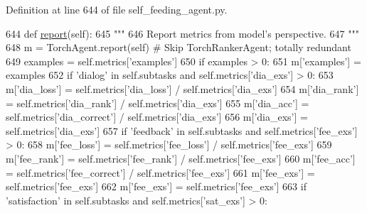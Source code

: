 Definition at line 644 of file self\+\_\+feeding\+\_\+agent.\+py.


\begin{DoxyCode}
644     \textcolor{keyword}{def }\hyperlink{namespaceprojects_1_1convai2_1_1eval__f1_a01a47b9c08dad189837a51f085defc45}{report}(self):
645         \textcolor{stringliteral}{"""}
646 \textcolor{stringliteral}{        Report metrics from model's perspective.}
647 \textcolor{stringliteral}{        """}
648         m = TorchAgent.report(self)  \textcolor{comment}{# Skip TorchRankerAgent; totally redundant}
649         examples = self.metrics[\textcolor{stringliteral}{'examples'}]
650         \textcolor{keywordflow}{if} examples > 0:
651             m[\textcolor{stringliteral}{'examples'}] = examples
652             \textcolor{keywordflow}{if} \textcolor{stringliteral}{'dialog'} \textcolor{keywordflow}{in} self.subtasks \textcolor{keywordflow}{and} self.metrics[\textcolor{stringliteral}{'dia\_exs'}] > 0:
653                 m[\textcolor{stringliteral}{'dia\_loss'}] = self.metrics[\textcolor{stringliteral}{'dia\_loss'}] / self.metrics[\textcolor{stringliteral}{'dia\_exs'}]
654                 m[\textcolor{stringliteral}{'dia\_rank'}] = self.metrics[\textcolor{stringliteral}{'dia\_rank'}] / self.metrics[\textcolor{stringliteral}{'dia\_exs'}]
655                 m[\textcolor{stringliteral}{'dia\_acc'}] = self.metrics[\textcolor{stringliteral}{'dia\_correct'}] / self.metrics[\textcolor{stringliteral}{'dia\_exs'}]
656                 m[\textcolor{stringliteral}{'dia\_exs'}] = self.metrics[\textcolor{stringliteral}{'dia\_exs'}]
657             \textcolor{keywordflow}{if} \textcolor{stringliteral}{'feedback'} \textcolor{keywordflow}{in} self.subtasks \textcolor{keywordflow}{and} self.metrics[\textcolor{stringliteral}{'fee\_exs'}] > 0:
658                 m[\textcolor{stringliteral}{'fee\_loss'}] = self.metrics[\textcolor{stringliteral}{'fee\_loss'}] / self.metrics[\textcolor{stringliteral}{'fee\_exs'}]
659                 m[\textcolor{stringliteral}{'fee\_rank'}] = self.metrics[\textcolor{stringliteral}{'fee\_rank'}] / self.metrics[\textcolor{stringliteral}{'fee\_exs'}]
660                 m[\textcolor{stringliteral}{'fee\_acc'}] = self.metrics[\textcolor{stringliteral}{'fee\_correct'}] / self.metrics[\textcolor{stringliteral}{'fee\_exs'}]
661                 m[\textcolor{stringliteral}{'fee\_exs'}] = self.metrics[\textcolor{stringliteral}{'fee\_exs'}]
662                 m[\textcolor{stringliteral}{'fee\_exs'}] = self.metrics[\textcolor{stringliteral}{'fee\_exs'}]
663             \textcolor{keywordflow}{if} \textcolor{stringliteral}{'satisfaction'} \textcolor{keywordflow}{in} self.subtasks \textcolor{keywordflow}{and} self.metrics[\textcolor{stringliteral}{'sat\_exs'}] > 0:

\end{DoxyCode}
